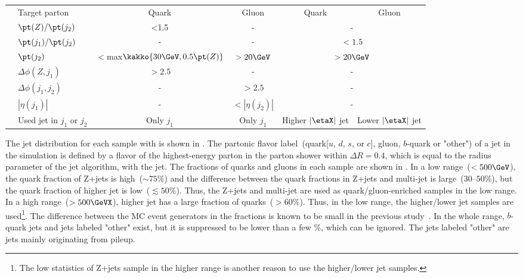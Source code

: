 \begin{table}[hptb]
\begin{tabular}{l|l|c|c|cc}
\parbox[t]{2mm}{}
 & Target parton         &  Quark   & Gluon  & Quark  & Gluon       \\ \hhline{~-----}
 & $\pt(Z)/\pt(j_2)$     &  <1.5    & -    &        \\ 
 & $\pt(j_1)/\pt(j_2)$   &  -       & -    &  \\ 
 & $\pt(j_2)$            &  $<$max$\kakko{30\GeV, 0.5\pt(Z)}$ & $>20\GeV$ &   \\
 & $\Delta\phi(Z,j_1)$   &  $>2.5$  & -    &   \\ 
 & $\Delta\phi(j_1,j_2)$ &  -       & $>2.5$         &   \\ 
 & $|\eta(j_1)|$         &  -       & $<|\eta(j_2)|$ &   \\ 
 & Used jet in $j_1$ or $j_2$ & Only $j_1$ & Only $j_1$ & Higher $|\etaX|$ jet & Lower $|\etaX|$ jet \\
 \hline
\end{tabular}
\label{tab:QG-sample}
\end{table}

The jet \pt distribution for each sample with  is shown in . %
The partonic flavor label~(quark[$u$, $d$, $s$, or $c$], gluon, $b$-quark or "other") of a jet in the simulation is defined %
by a flavor of the highest-energy parton in the parton shower %
within $\Delta R=0.4$, which is equal to the radius parameter of the jet algorithm, with the jet.
The fractions of quarks and gluons in each sample are shown in .
In a low \pt range~($<500\GeV$), the quark fraction of Z+jets is high~($\sim75\%$) %
and the difference between the quark fractions in Z+jets and multi-jet is large~($30$--$50\%$), %
but the quark fraction of higher \abseta jet is low~($\lesssim 50\%$). %
Thus, the Z+jets and multi-jet are used as quark/gluon-enriched samples in the low \pt range. %
In a high \pt range~($>500\GeVX$), higher \abseta jet has a large fraction of quarks~($>60\%$). %
Thus, in the low \pt range, the higher/lower \abseta jet samples are used\footnote{
The low statistics of Z+jets sample in the higher \pt range is another reason to use the higher/lower \abseta jet samples. %
}. %
The difference between the MC event generators in the fractions is known to be small in the previous study~\cite{ref21}. %
In the whole \pt range, $b$-quark jets and jets labeled "other" exist, %
but it is suppressed to be lower than a few \%, which can be ignored. %
The jets labeled "other" are jets mainly originating from pileup. %

